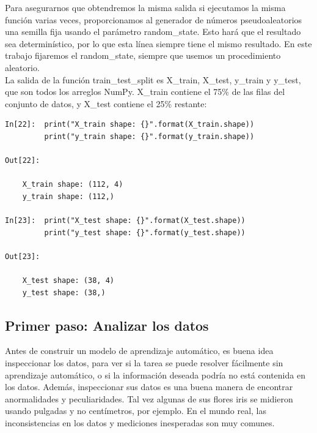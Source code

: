 Para asegurarnos  que obtendremos la misma salida si ejecutamos la misma función varias veces, proporcionamos al generador de números pseudoaleatorios una semilla fija usando el parámetro {\ttfamily random\_state}. Esto hará que el resultado sea determinístico, por lo que esta línea siempre tiene el mismo resultado. En este trabajo  fijaremos el {\ttfamily random\_state}, siempre que usemos un procedimiento aleatorio.\\



La salida de la función {\ttfamily train\_test\_split} \:es\: {\ttfamily X\_train, X\_test, y\_train}  y
{\ttfamily y\_test}, que son todos los arreglos {\ttfamily NumPy}.  {\ttfamily X\_train} contiene el 75\% de las filas del conjunto de datos,  y {\ttfamily X\_test} contiene el 25\% restante:\\

\begin{lstlisting}
In[22]:  print("X_train shape: {}".format(X_train.shape))
         print("y_train shape: {}".format(y_train.shape))

Out[22]:

    X_train shape: (112, 4)
    y_train shape: (112,)

In[23]:  print("X_test shape: {}".format(X_test.shape))
         print("y_test shape: {}".format(y_test.shape))

Out[23]:
    
    X_test shape: (38, 4)
    y_test shape: (38,)

\end{lstlisting}





\subsection{Primer paso: Analizar los datos}


Antes de construir un modelo de aprendizaje automático, es buena idea inspeccionar los datos,
para ver si la tarea se puede resolver fácilmente sin aprendizaje automático, o si la información deseada
podría no está contenida en los datos. Además, inspeccionar sus datos es una buena manera de encontrar anormalidades y peculiaridades.  Tal vez algunas de sus flores iris se midieron usando pulgadas y no centímetros, por ejemplo. En el mundo real, las inconsistencias en los datos y mediciones inesperadas son muy comunes.


